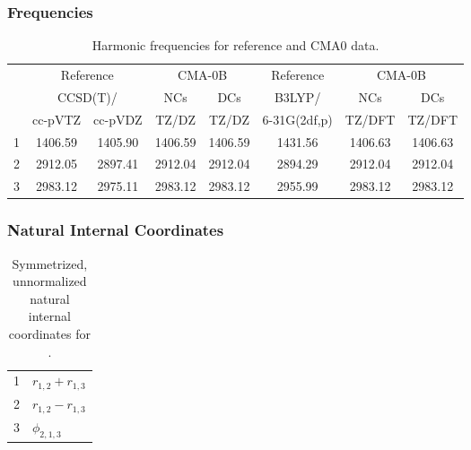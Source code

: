 \documentclass[10pt,oneside]{article}
\begin{document}
\subsubsection*{Frequencies}
\begin{table}[h!]
\centering
\caption{Harmonic frequencies for reference and CMA0 data.}
\begin{tabular}{cccccccc}
\toprule
{} & \multicolumn{2}{c}{Reference} & \multicolumn{2}{c}{CMA-0B} &    Reference & \multicolumn{2}{c}{CMA-0B} \\
{} & \multicolumn{2}{c}{CCSD(T)/} &     NCs &     DCs &       B3LYP/ &     NCs &     DCs \\
{} &   cc-pVTZ & cc-pVDZ &   TZ/DZ &   TZ/DZ & 6-31G(2df,p) &  TZ/DFT &  TZ/DFT \\
\midrule
1 &   1406.59 & 1405.90 & 1406.59 & 1406.59 &      1431.56 & 1406.63 & 1406.63 \\
2 &   2912.05 & 2897.41 & 2912.04 & 2912.04 &      2894.29 & 2912.04 & 2912.04 \\
3 &   2983.12 & 2975.11 & 2983.12 & 2983.12 &      2955.99 & 2983.12 & 2983.12 \\
\bottomrule
\end{tabular}
\end{table}

\clearpage

\subsubsection*{Natural Internal Coordinates}
\begin{table}[h!]
\centering
\caption{Symmetrized, unnormalized natural internal coordinates for .}
\small
\begin{tabular}{ll}
  1   & $r_{1,2} + r_{1,3}$ \\
  2   & $r_{1,2} - r_{1,3}$ \\
  3   & $\phi_{2,1,3}$ \\
\end{tabular}
\end{table}

\clearpage

\subsection{\ \ \ }
\end{document}
